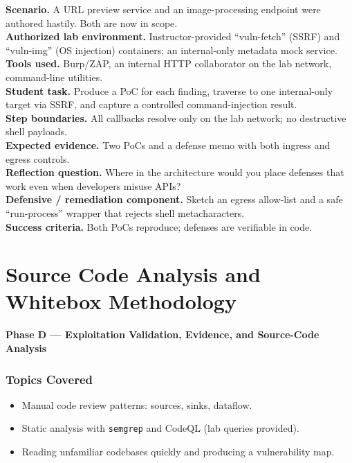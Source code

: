 \documentclass[11pt,letterpaper,oneside]{report}
\newcommand{\tool}[1]{\texttt{\small #1}}
\begin{document}
\begin{labbox}
\textbf{Scenario.} A URL preview service and an image-processing endpoint were authored hastily. Both are now in scope.\\[3pt]
\textbf{Authorized lab environment.} Instructor-provided ``vuln-fetch'' (SSRF) and ``vuln-img'' (OS injection) containers; an internal-only metadata mock service.\\[3pt]
\textbf{Tools used.} Burp/ZAP, an internal HTTP collaborator on the lab network, command-line utilities.\\[3pt]
\textbf{Student task.} Produce a PoC for each finding, traverse to one internal-only target via SSRF, and capture a controlled command-injection result.\\[3pt]
\textbf{Step boundaries.} All callbacks resolve only on the lab network; no destructive shell payloads.\\[3pt]
\textbf{Expected evidence.} Two PoCs and a defense memo with both ingress and egress controls.\\[3pt]
\textbf{Reflection question.} Where in the architecture would you place defenses that work even when developers misuse APIs?\\[3pt]
\textbf{Defensive / remediation component.} Sketch an egress allow-list and a safe ``run-process'' wrapper that rejects shell metacharacters.\\[3pt]
\textbf{Success criteria.} Both PoCs reproduce; defenses are verifiable in code.
\end{labbox}

\chapter{Source Code Analysis and Whitebox Methodology}
\textbf{Phase D --- Exploitation Validation, Evidence, and Source-Code Analysis}

\subsection*{Topics Covered}
\begin{itemize}
  \item Manual code review patterns: sources, sinks, dataflow.
  \item Static analysis with \tool{semgrep} and CodeQL (lab queries provided).
  \item Reading unfamiliar codebases quickly and producing a vulnerability map.
\end{itemize}
\end{document}
